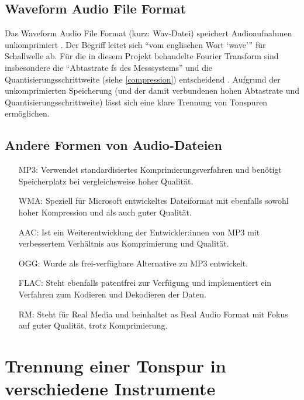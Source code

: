 %
\subsection{Waveform Audio File Format}
%

Das Waveform Audio File Format (kurz: Wav-Datei) speichert Audioaufnahmen unkomprimiert \parencite{what_is_a_wav_file}. Der Begriff leitet sich \enquote{vom englischen Wort \enquote{wave}} \parencite{wav} für Schallwelle ab. Für die in diesem Projekt behandelte Fourier Transform sind insbesondere die \enquote{Abtastrate fs des Messsystems} und die Quantisierungsschrittweite (siehe \cref{compression}) entscheidend  \parencite{FFT_grundlagen}. Aufgrund der unkomprimierten Speicherung (und der damit verbundenen hohen Abtastrate und Quantisierungsschrittweite) lässt sich eine klare Trennung von Tonspuren ermöglichen.


%
\subsection{Andere Formen von Audio-Dateien}
\label{audio_representations}
%

%
\begin{itemize}
    \item [MP3:] Verwendet standardisiertes Komprimierungsverfahren und benötigt Speicherplatz bei vergleichsweise hoher Qualität.
    \item [WMA:] Speziell für Microsoft entwickeltes Dateiformat mit ebenfalls sowohl hoher Kompression und als auch guter Qualität.
    \item [AAC:] Ist ein Weiterentwicklung der Entwickler:innen von MP3 mit verbessertem Verhältnis aus Komprimierung und Qualität.
    \item [OGG:] Wurde als frei-verfügbare Alternative zu MP3 entwickelt.
    \item [FLAC:] Steht ebenfalls patentfrei zur Verfügung und implementiert ein Verfahren zum Kodieren und Dekodieren der Daten.
    \item [RM:] Steht für Real Media und beinhaltet as Real Audio Format mit Fokus auf guter Qualität, trotz Komprimierung.
\end{itemize}
%

\parencite{audioformate_im_überblick}

%
\section{Trennung einer Tonspur in verschiedene Instrumente}
%

